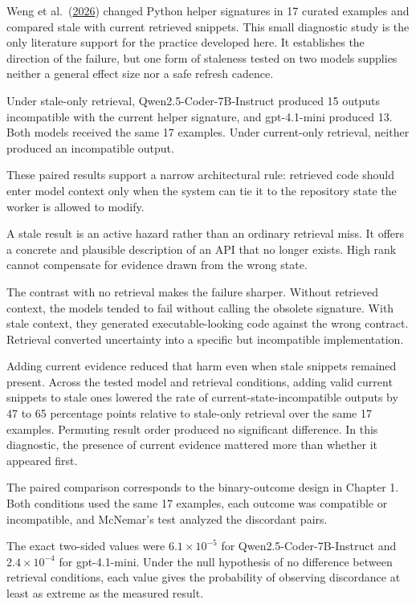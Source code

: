 Weng et al.~(\href{https://arxiv.org/abs/2605.14478}{2026}) changed Python helper signatures in 17 curated examples and compared stale with current retrieved snippets. This small diagnostic study is the only literature support for the practice developed here. It establishes the direction of the failure, but one form of staleness tested on two models supplies neither a general effect size nor a safe refresh cadence.

Under stale-only retrieval, Qwen2.5-Coder-7B-Instruct produced 15 outputs incompatible with the current helper signature, and gpt-4.1-mini produced 13. Both models received the same 17 examples. Under current-only retrieval, neither produced an incompatible output.

These paired results support a narrow architectural rule: retrieved code should enter model context only when the system can tie it to the repository state the worker is allowed to modify.

A stale result is an active hazard rather than an ordinary retrieval miss. It offers a concrete and plausible description of an API that no longer exists. High rank cannot compensate for evidence drawn from the wrong state.

The contrast with no retrieval makes the failure sharper. Without retrieved context, the models tended to fail without calling the obsolete signature. With stale context, they generated executable-looking code against the wrong contract. Retrieval converted uncertainty into a specific but incompatible implementation.

Adding current evidence reduced that harm even when stale snippets remained present. Across the tested model and retrieval conditions, adding valid current snippets to stale ones lowered the rate of current-state-incompatible outputs by 47 to 65 percentage points relative to stale-only retrieval over the same 17 examples. Permuting result order produced no significant difference. In this diagnostic, the presence of current evidence mattered more than whether it appeared first.

The paired comparison corresponds to the binary-outcome design in Chapter 1. Both conditions used the same 17 examples, each outcome was compatible or incompatible, and McNemar's test analyzed the discordant pairs.

The exact two-sided values were \(6.1 \times 10^{-5}\) for Qwen2.5-Coder-7B-Instruct and \(2.4 \times 10^{-4}\) for gpt-4.1-mini. Under the null hypothesis of no difference between retrieval conditions, each value gives the probability of observing discordance at least as extreme as the measured result.

